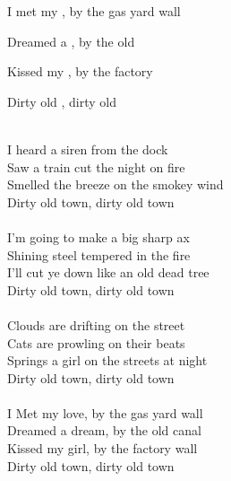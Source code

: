 \begin{SBVerse*}
I met my , by the gas yard wall

Dreamed a , by the old 

Kissed my , by the factory 

Dirty old , dirty old 
\end{SBVerse*}
~\\
I heard a siren from the dock\\
Saw a train cut the night on fire\\
Smelled the breeze on the smokey wind\\
Dirty old town, dirty old town\\
~\\
I'm going to make a big sharp ax\\
Shining steel tempered in the fire\\
I'll cut ye down like an old dead tree\\
Dirty old town, dirty old town\\
~\\
Clouds are drifting on the street\\
Cats are prowling on their beats\\
Springs a girl on the streets at night\\
Dirty old town, dirty old town\\
~\\
I Met my love, by the gas yard wall\\
Dreamed a dream, by the old canal\\
Kissed my girl, by the factory wall\\
Dirty old town, dirty old town\\
